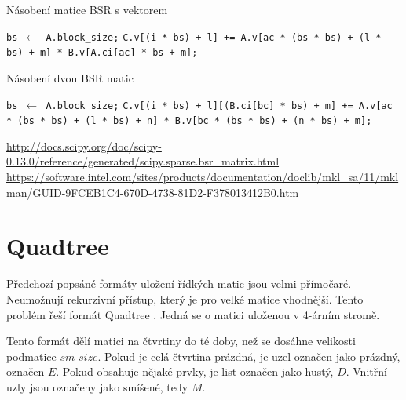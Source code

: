 \label{alg:bsr-mvm}
\begin{algorithm}[H]
	\caption{Násobení matice BSR s vektorem}\label{bsr-mvm}
	\begin{algorithmic}[1]
		\State \texttt{bs $\gets$ A.block\_size;}
						\State \texttt{C.v[(i * bs) + l] += A.v[ac * (bs * bs) + (l * bs) + m] * B.v[A.ci[ac] * bs + m];}
					\EndFor
				\EndFor
			\EndFor
		\EndFor
		\EndProcedure
	\end{algorithmic}
\end{algorithm}

\label{alg:bsr-mmm}
\begin{algorithm}[H]
	\caption{Násobení dvou BSR matic}\label{bsr-mmm}
	\begin{algorithmic}[1]
		\State \texttt{bs $\gets$ A.block\_size;}
								\State \texttt{C.v[(i * bs) + l][(B.ci[bc] * bs) + m] += A.v[ac * (bs * bs) + (l * bs) + n] * B.v[bc * (bs * bs) + (n * bs) + m];}
							\EndFor
						\EndFor
					\EndFor
				\EndFor
			\EndFor
		\EndFor
		\EndProcedure
	\end{algorithmic}
\end{algorithm}

\url{http://docs.scipy.org/doc/scipy-0.13.0/reference/generated/scipy.sparse.bsr_matrix.html}
\url{https://software.intel.com/sites/products/documentation/doclib/mkl_sa/11/mklman/GUID-9FCEB1C4-670D-4738-81D2-F378013412B0.htm}

\section{Quadtree}

Předchozí popsáné formáty uložení řídkých matic jsou velmi přímočaré. Neumožnují rekurzivní přístup, který je pro velké matice vhodnější. Tento problém řeší formát Quadtree \cite{JA_SNA_08_QUAD}. Jedná se o matici uloženou v 4-árním stromě.

Tento formát dělí matici na čtvrtiny do té doby, než se dosáhne velikosti podmatice $sm\_size$. Pokud je celá čtvrtina prázdná, je uzel označen jako prázdný, označen $E$. Pokud obsahuje nějaké prvky, je list označen jako hustý, $D$. Vnitřní uzly jsou označeny jako smíšené, tedy $M$.

